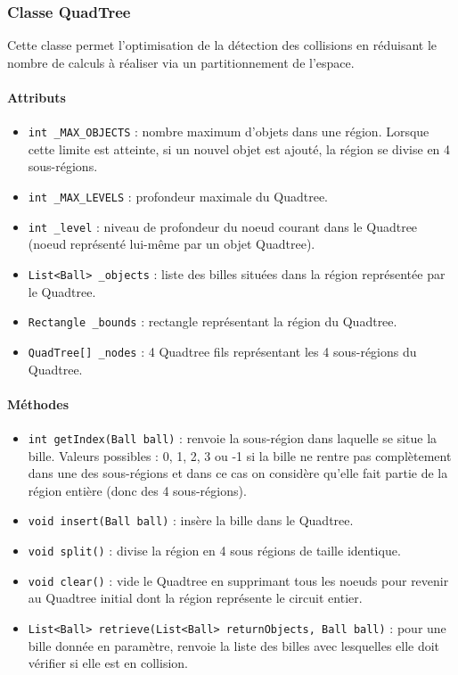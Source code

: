 \documentclass{report}
\begin{document}
\subsubsection{Classe QuadTree}

Cette classe permet l'optimisation de la détection des collisions en réduisant le nombre de calculs à réaliser via un partitionnement de l'espace.

\paragraph*{Attributs}
\begin{itemize}
\item \texttt{int \_MAX\_OBJECTS} : nombre maximum d'objets dans une région. Lorsque cette limite est atteinte, si un nouvel objet est ajouté, la région se divise en 4 sous-régions.
\item \texttt{int \_MAX\_LEVELS} : profondeur maximale du Quadtree.
\item \texttt{int \_level} : niveau de profondeur du noeud courant dans le Quadtree (noeud représenté lui-même par un objet Quadtree).
\item \texttt{List<Ball> \_objects} : liste des billes situées dans la région représentée par le Quadtree.
\item \texttt{Rectangle \_bounds} : rectangle représentant la région du Quadtree.
\item \texttt{QuadTree[] \_nodes} : 4 Quadtree fils représentant les 4 sous-régions du Quadtree.
\end{itemize}

\paragraph*{Méthodes}
\begin{itemize}
\item \texttt{int getIndex(Ball ball)} : renvoie la sous-région dans laquelle se situe la bille. Valeurs possibles : 0, 1, 2, 3 ou -1 si la bille ne rentre pas complètement dans une des sous-régions et dans ce cas on considère qu'elle fait partie de la région entière (donc des 4 sous-régions).
\item \texttt{void insert(Ball ball)} : insère la bille dans le Quadtree.
\item \texttt{void split()} : divise la région en 4 sous régions de taille identique.
\item \texttt{void clear()} : vide le Quadtree en supprimant tous les noeuds pour revenir au Quadtree initial dont la région représente le circuit entier.
\item \texttt{List<Ball> retrieve(List<Ball> returnObjects, Ball ball)} : pour une bille donnée en paramètre, renvoie la liste des billes avec lesquelles elle doit vérifier si elle est en collision.
\end{itemize}
\end{document}
